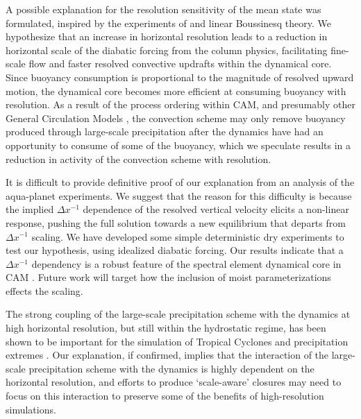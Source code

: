 A possible explanation for the resolution sensitivity of the mean state was formulated, inspired by the experiments of \cite{W1999T} and linear Boussinesq theory. We hypothesize that an increase in horizontal resolution leads to a reduction in horizontal scale of the diabatic forcing from the column physics, facilitating fine-scale flow and faster resolved convective updrafts within the dynamical core. Since buoyancy consumption is proportional to the magnitude of resolved upward motion, the dynamical core becomes more efficient at consuming buoyancy with resolution. As a result of the process ordering within CAM, and presumably other General Circulation Models \citep{B1991ECMWF}, the convection scheme may only remove buoyancy produced through large-scale precipitation after the dynamics have had an opportunity to consume of some of the buoyancy, which we speculate results in a reduction in activity of the convection scheme with resolution.

It is difficult to provide definitive proof of our explanation from an analysis of the aqua-planet experiments. We suggest that the reason for this difficulty is because the implied $\Delta x^{-1}$ dependence of the resolved vertical velocity elicits a non-linear response, pushing the full solution towards a new equilibrium that departs from $\Delta x^{-1}$ scaling. We have developed some simple deterministic dry experiments to test our hypothesis, using idealized diabatic forcing. Our results indicate that a $\Delta x^{-1}$ dependency is a robust feature of the spectral element dynamical core in CAM \citep{HR2018JAMES}. Future work will target how the inclusion of moist parameterizations effects the  scaling.

The strong coupling of the large-scale precipitation scheme with the dynamics at high horizontal resolution, but still within the hydrostatic regime, has been shown to be important for the simulation of Tropical Cyclones \citep{ZHL2012JAS} and precipitation extremes \citep{LETAL2011TELLUS,YETAL2014JCLIM,RETAL2016CD,OETAL2016JAMES}. Our explanation, if confirmed, implies that the interaction of the large-scale precipitation scheme with the dynamics is highly dependent on the horizontal resolution, and efforts to produce ‘scale-aware’ closures may need to focus on this interaction to preserve some of the benefits of high-resolution simulations. 